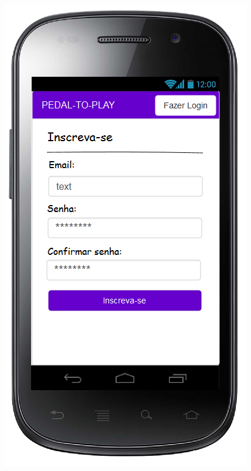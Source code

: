 \begin{figure}
\begin{minipage}{.5\textwidth}
  \centerline{\includegraphics[width=0.7\linewidth]{figuras/Inscreva-se.png}}
  \label{fig:signupProto}
\end{minipage}
\end{figure}

